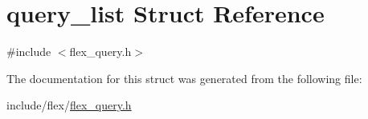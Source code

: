 \hypertarget{structquery__list}{}\section{query\+\_\+list Struct Reference}
\label{structquery__list}


{\ttfamily \#include $<$flex\+\_\+query.\+h$>$}



The documentation for this struct was generated from the following file\+:\begin{DoxyCompactItemize}
\item 
include/flex/\hyperlink{flex__query_8h}{flex\+\_\+query.\+h}\end{DoxyCompactItemize}
